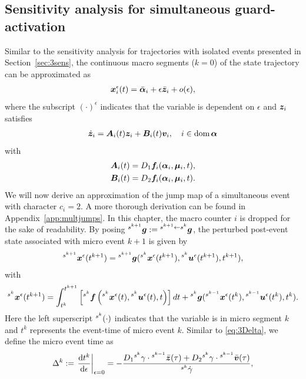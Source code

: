 \documentclass[../DC2017114Bouma.tex]{subfiles}
\begin{document}
\subsection{Sensitivity analysis for simultaneous guard-activation}
Similar to the sensitivity analysis for trajectories with isolated events presented in Section~\ref{sec:3sens}, the continuous macro segments ($k=0$) of the state trajectory can be approximated as
\begin{align}
{\boldsymbol{x}}_i^\epsilon(t) = \bar{\boldsymbol{\alpha}}_i + \epsilon\bar{{\boldsymbol{z}}}_i + o(\epsilon),
\end{align}
where the subscript $(\cdot)^\epsilon$ indicates that the variable is dependent on $\epsilon$ and ${\boldsymbol{z}}_i$ satisfies
\begin{align}
\dot{{\boldsymbol{z}}}_i = {\boldsymbol{A}}_i(t){\boldsymbol{z}}_i +{\boldsymbol{B}}_i(t){\boldsymbol{v}}_i,\quad i\in \operatorname{\textnormal{dom}}\boldsymbol{\alpha}
\end{align}
with
\begin{align*}
{\boldsymbol{A}}_i(t) &= D_1{\boldsymbol{f}}_i(\boldsymbol{\alpha}_i,\boldsymbol{\mu}_i,t),\\
{\boldsymbol{B}}_i(t) &= D_2{\boldsymbol{f}}_i(\boldsymbol{\alpha}_i,\boldsymbol{\mu}_i,t).
\end{align*}
We will now derive an approximation of the jump map of a simultaneous event with character $c_i = 2$. A more thorough derivation can be found in Appendix~\ref{app:multjumps}. In this chapter, the macro counter $i$ is dropped for the sake of readability. By posing $\hspace{0cm}^{s^{k+1}}{\boldsymbol{g}} := \hspace{0cm}^{s^{k+1}\leftarrow s^k}{\boldsymbol{g}}$, the perturbed post-event state associated with micro event $k+1$ is given by
\begin{align}
\hspace{0cm}^{s^{k+1}}{\boldsymbol{x}}^\epsilon(t^{k+1}) = \hspace{0cm}^{s^{k+1}}{\boldsymbol{g}}(\hspace{0cm}^{s^{k}}{\boldsymbol{x}}^\epsilon(t^{k+1}),\hspace{0cm}^{s^{k}}{\boldsymbol{u}}^\epsilon(t^{k+1}),t^{k+1}),\label{eq:4xe012}
\end{align}
with
\begin{align}
\hspace{0cm}^{s^{k}}{\boldsymbol{x}}^\epsilon(t^{k+1}) = \int_{t^{k}}^{t^{k+1}}\left[\hspace{0cm}^{s^{k}}{\boldsymbol{f}}\left(\hspace{0cm}^{s^{k}}{\boldsymbol{x}}^\epsilon(t),\hspace{0cm}^{s^{k}}{\boldsymbol{u}}^\epsilon(t),t\right)\right]dt + \hspace{0cm}^{s^{k}}{\boldsymbol{g}}(\hspace{0cm}^{s^{k-1}}{\boldsymbol{x}}^\epsilon(t^{k}),\hspace{0cm}^{s^{k-1}}{\boldsymbol{u}}^\epsilon(t^{k}),t^{k}).\label{eq:4xe01}
\end{align}
Here the left superscript $\hspace{0cm}^{s^k}(\cdot)$ indicates that the variable is in micro segment $k$ and $t^k$ represents the event-time of micro event $k$. Similar to \eqref{eq:3Delta}, we define the micro event time as
\begin{align}
\Delta^k := \left.\frac{\textnormal{d} t^k}{\textnormal{d}\epsilon}\right|_{\epsilon=0} = -\frac{D_1\hspace{0cm}^{s^{k}}\gamma\cdot\hspace{0cm}^{s^{k-1}}\bar{{\boldsymbol{z}}}(\tau) + D_2\hspace{0cm}^{s^{k}}\gamma\cdot\hspace{0cm}^{s^{k-1}}\bar{{\boldsymbol{v}}}(\tau)}{\hspace{0cm}^{s^{k}}\dot{\gamma}},\label{eq:4Deltak}
\end{align}
\end{document}
